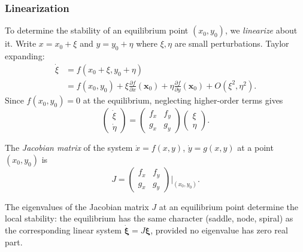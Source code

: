 \documentclass[a4paper]{article}
\begin{document}
\subsubsection{Linearization}
\begin{remark}
  To determine the stability of an equilibrium point $(x_0, y_0)$, we \emph{linearize} about it. Write $x = x_0 + \xi$ and $y = y_0 + \eta$ where $\xi, \eta$ are small perturbations. Taylor expanding:
  \begin{align*}
    \dot \xi &= f(x_0 + \xi, y_0 + \eta)\\
    &= f(x_0, y_0)+ \xi \frac{\partial f}{\partial x}(\mathbf{x}_0) + \eta \frac{\partial f}{\partial y}(\mathbf{x}_0) + O(\xi^2, \eta^2).
  \end{align*}
  Since $f(x_0, y_0) = 0$ at the equilibrium, neglecting higher-order terms gives
  \[
    \begin{pmatrix}
      \dot \xi\\\dot \eta
    \end{pmatrix} =
    \begin{pmatrix}
      f_x & f_y\\
      g_x & g_y
    \end{pmatrix}
    \begin{pmatrix}
      \xi\\\eta
    \end{pmatrix}.
  \]
\end{remark}

\begin{defi}
  The \emph{Jacobian matrix} of the system $\dot{x} = f(x,y)$, $\dot{y} = g(x,y)$ at a point $(x_0, y_0)$ is
  \[
    J = \begin{pmatrix} f_x & f_y \\ g_x & g_y \end{pmatrix}\bigg|_{(x_0, y_0)}.
  \]
\end{defi}

\begin{prop}
  The eigenvalues of the Jacobian matrix $J$ at an equilibrium point determine the local stability: the equilibrium has the same character (saddle, node, spiral) as the corresponding linear system $\dot{\boldsymbol{\xi}} = J\boldsymbol{\xi}$, provided no eigenvalue has zero real part.
\end{prop}
\end{document}
